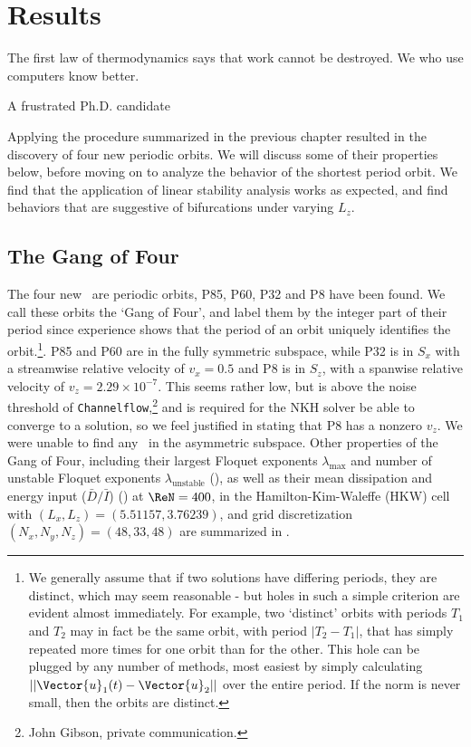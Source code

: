 \chapter{Results}
\epigraph{The first law of thermodynamics says that work cannot be destroyed. We who use computers know better.}{A frustrated Ph.D. candidate}

Applying the procedure summarized in the previous chapter resulted in the discovery of four new periodic orbits. We will discuss some of their properties below, before moving on to analyze the behavior of the shortest period orbit. We find that the application of linear stability analysis works as expected, and find behaviors that are suggestive of bifurcations under varying $L_z$.   
\section{The Gang of Four}

The four new \ecs\ are periodic orbits, P85, P60, P32 and P8 have been found. We call these orbits the `Gang of Four', and label them by the integer part of their period since experience shows that the period of an orbit uniquely identifies the orbit.\footnote{We generally assume that if two solutions have differing periods, they are distinct, which may seem reasonable - but holes in such a simple criterion are evident almost immediately. For example, two `distinct' orbits with periods $T_1$ and $T_2$ may in fact be the same orbit, with period $|T_2-T_1|$, that has simply repeated more times for one orbit than for the other. This hole can be plugged by any number of methods, most easiest by simply calculating $||\Vector{u}_1(t) - \Vector{u}_2||$ over the entire period. If the norm is never small, then the orbits are distinct. }.  P85 and P60 are in the fully symmetric subspace, while P32 is in $S_x$ with a streamwise relative velocity of $v_x = 0.5$ and P8 is in $S_z$, with a spanwise relative velocity of $v_z = 2.29\times 10^{-7}$. This seems rather low, but is above the noise threshold of {\tt Channelflow},\footnote{John Gibson, private communication.} and is required for the NKH solver be able to converge to a solution, so we feel justified in stating that P8 has a nonzero $v_z$. We were unable to find any \ecs\ in the asymmetric subspace. Other properties of the Gang of Four, including their largest Floquet exponents $\lambda_{\textrm{max}}$ and number of unstable Floquet exponents $\lambda_{\textrm{unstable}}$ (), as well as their mean dissipation and energy input ($\bar{D}/\bar{I}$) () at  $\ReN = 400$, in the Hamilton-Kim-Waleffe (HKW) cell with $(L_x,L_z) = (5.51157, 3.76239)$, and grid discretization $(N_x,N_y,N_z)= (48,33,48)$  are summarized in . 

